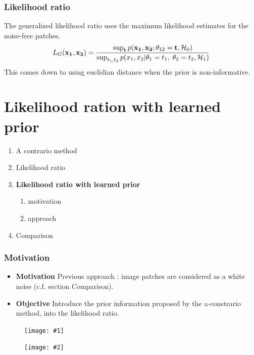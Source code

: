 \documentclass[compress]{beamer} %
\newcommand{\insertTwoF}[4]{
  \begin{figure}[h!]
    \centering
    \begin{minipage}{#4\linewidth}
    \texttt{[image: \#1]}
    \end{minipage}
    \begin{minipage}{#4\linewidth}
    \texttt{[image: \#2]}
    \end{minipage}
      \caption{#3}
  \end{figure}  
}
\begin{document}
\begin{frame}
\frametitle{Likelihood ratio}
The generalized likelihood ratio uses the maximum likelihood estimates for the noise-free patches.
\[
L_G(\mathbf{x_1},\mathbf{x_2})=\frac{\sup_\mathbf{t}p(\mathbf{x_1},\mathbf{x_2};\theta_{12}=\mathbf{t},\mathcal{H}_0)}
{\sup_{t_1,t_2}p(x_1,x_2 \arrowvert \theta_1=t_1,\; \theta_2=t_2 , \mathcal{H}_1)}
\]
This comes down to using euclidian distance when the prior is non-informative.
\end{frame}
 
 \section{Likelihood ration with learned prior}
 \begin{frame}
 \scriptsize
 {
 \begin{enumerate}


  \item A contrario method
  \item Likelihood ratio
  \item \textbf{Likelihood ratio with learned prior}
  \begin{enumerate}
   \item motivation
   \item approach
  \end{enumerate}

  \item Comparison
  
 \end{enumerate}

  
 }
 \end{frame} 
 
 \begin{frame}
  \frametitle{Motivation}
   \begin{itemize}
    \item{\textbf{Motivation}} Previous approach : image patches are considered as a white noise (c.f. section Comparison).
    \item{\textbf{Objective}} Introduce the prior information proposed by the a-constrario method, into the likelihood ratio.
   \end{itemize}
   \insertTwoF{lena.jpg}{wn}{}{0.4}
 \end{frame}
 
\end{document}
